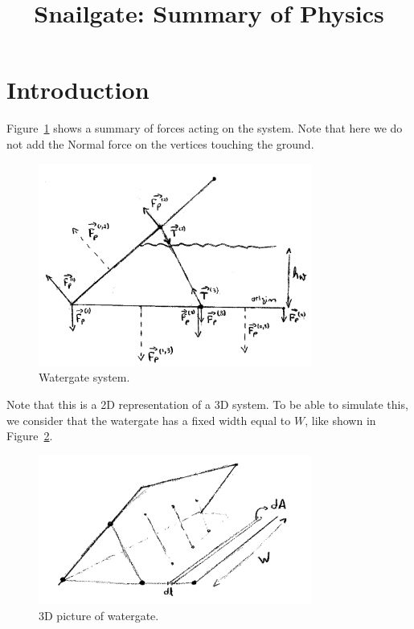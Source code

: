 \documentclass[12pt]{article}
\title{Snailgate: Summary of Physics}
\begin{document}
\maketitle

\section{Introduction}
Figure~\ref{fig:system} shows a summary of forces acting on the system. Note that here we do not add the Normal force on the vertices touching the ground.
\begin{figure}[hbt]
  \begin{center}
    \includegraphics[width=0.8\textwidth]{system.png}
  \end{center}
  \caption{Watergate system.}
  \label{fig:system}
\end{figure}

Note that this is a 2D representation of a 3D system. To be able to simulate this, we consider that the watergate has a fixed width equal to $W$, like shown in Figure~\ref{fig:3D}.
\begin{figure}[hbt]
  \begin{center}
    \includegraphics[width=0.8\textwidth]{3D.png}
  \end{center}
  \caption{3D picture of watergate.}
  \label{fig:3D}
\end{figure}
\end{document}
